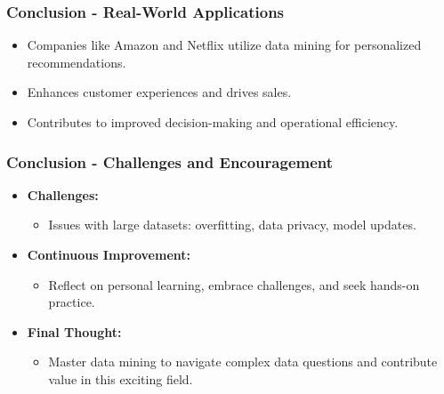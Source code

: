 \documentclass[aspectratio=169]{beamer}
\begin{document}
\begin{frame}[fragile]
  \frametitle{Conclusion - Real-World Applications}
  \begin{itemize}
    \item Companies like Amazon and Netflix utilize data mining for personalized recommendations.
    \item Enhances customer experiences and drives sales.
    \item Contributes to improved decision-making and operational efficiency.
  \end{itemize}
\end{frame}

\begin{frame}[fragile]
  \frametitle{Conclusion - Challenges and Encouragement}
  \begin{itemize}
    \item \textbf{Challenges:}
    \begin{itemize}
      \item Issues with large datasets: overfitting, data privacy, model updates.
    \end{itemize}
    
    \item \textbf{Continuous Improvement:}
    \begin{itemize}
      \item Reflect on personal learning, embrace challenges, and seek hands-on practice.
    \end{itemize}
    
    \item \textbf{Final Thought:}
    \begin{itemize}
      \item Master data mining to navigate complex data questions and contribute value in this exciting field.
    \end{itemize}
  \end{itemize}
\end{frame}
\end{document}
